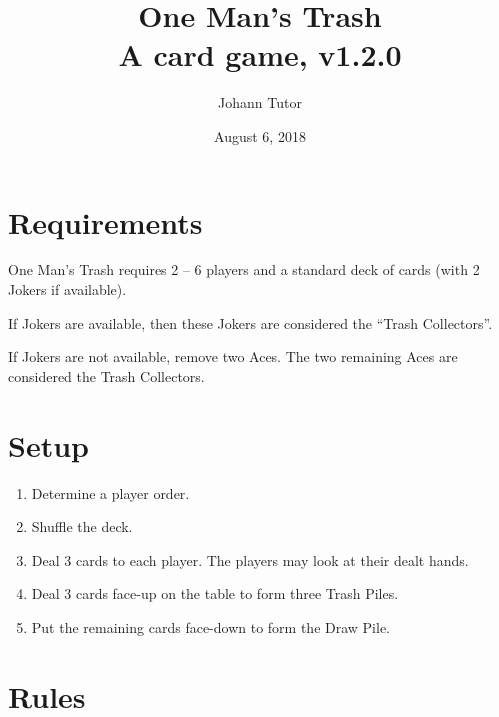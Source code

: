 \documentclass{article}
\newcommand\theversion{1.2.0}
\newcommand\thegame{One Man's Trash}
\begin{document}
\title{\thegame{}\\ \large A card game, v\theversion}
\author{Johann Tutor}
\date{August 6, 2018}
\maketitle


\tableofcontents

\newpage

\section{Requirements \label{sec:requirements}}

\thegame{} requires 2 -- 6 players and a standard deck of cards (with 2 Jokers if available).

If Jokers are available, then these Jokers are considered the ``Trash Collectors''.

If Jokers are not available, remove two Aces.
The two remaining Aces are considered the Trash Collectors.

\section{Setup \label{sec:setup}}

\begin{enumerate}
  \item Determine a player order.
  \item Shuffle the deck.
  \item Deal 3 cards to each player. The players may look at their dealt hands.
  \item Deal 3 cards face-up on the table to form three Trash Piles.
  \item Put the remaining cards face-down to form the Draw Pile.
\end{enumerate}

\section{Rules \label{sec:rules}}
\end{document}
